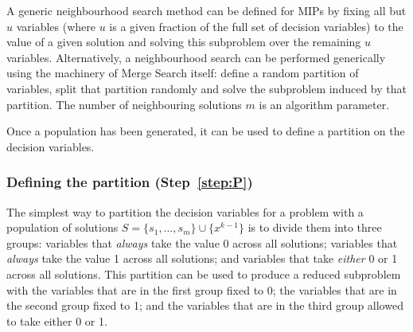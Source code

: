 \documentclass[journal]{IEEEtran}
\begin{document}
A generic neighbourhood search method can be defined for MIPs by fixing all but \(u\) variables (where \(u\) is a given fraction of the full set of decision variables) to the value of a given solution and solving this subproblem over the remaining \(u\) variables. Alternatively, a neighbourhood search can be performed generically using the machinery of Merge Search itself: define a random partition of variables, split that partition randomly and solve the subproblem induced by that partition. The number of neighbouring solutions $m$ is an algorithm parameter.

Once a population has been generated, it can be used to define a partition on the decision variables.

\subsubsection*{Defining the partition (Step~\ref{step:P})}


The simplest way to partition the decision variables for a problem with a population of solutions $S = \{s_1,\dots,s_m\}\cup \{x^{k-1}\}$ is to divide them into three groups: variables that \emph{always} take the value 0 across all solutions; variables that \emph{always} take the value 1 across all solutions; and variables that take \emph{either} 0 or 1 across all solutions. This partition can be used to produce a reduced subproblem with the variables that are in the first group fixed to 0; the variables that are in the second group fixed to 1; and the variables that are in the third group allowed to take either 0 or 1.
\end{document}
